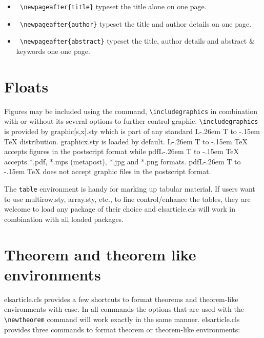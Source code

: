 \documentclass[a4paper,12pt]{article}
\makeatletter
\def\file#1{\textsf{#1}\xspace}
\DeclareRobustCommand{\LaTeX}{L\kern-.26em%
        {\sbox\z@ T%
         \vbox to\ht\z@{\hbox{\check@mathfonts
           \fontsize\sf@size\z@
           \math@fontsfalse\selectfont
          A\,}%
         \vss}%
        }%
     \kern-.15em%
    \TeX}
\makeatother
\begin{document}
\begin{vquote}
\end{vquote}


\begin{itemize}
\leftskip-2pc
\item [] {\tt\color{verbcolor} \verb+\newpageafter{title}+} typeset the title alone on one page.

\item [] {\tt\color{verbcolor} \verb+\newpageafter{author}+}  typeset the title
and author details on one page.

\item [] {\tt\color{verbcolor} \verb+\newpageafter{abstract}+}
typeset the title,
author details and abstract \& keywords one one page.

\end{itemize}

\section{Floats}
{Figures} may be included using the command, \verb+\includegraphics+ in
combination with or without its several options to further control
graphic. \verb+\includegraphics+ is provided by \file{graphic[s,x].sty}
which is part of any standard \LaTeX{} distribution.
\file{graphicx.sty} is loaded by default. \LaTeX{} accepts figures in
the postscript format while pdf\LaTeX{} accepts \file{*.pdf},
\file{*.mps} (metapost), \file{*.jpg} and \file{*.png} formats. 
pdf\LaTeX{} does not accept graphic files in the postscript format. 

The \verb+table+ environment is handy for marking up tabular
material. If users want to use \file{multirow.sty},
\file{array.sty}, etc., to fine control/enhance the tables, they
are welcome to load any package of their choice and
\file{elsarticle.cls} will work in combination with all loaded
packages.

\section[Theorem and ...]{Theorem and theorem like environments}

\file{elsarticle.cls} provides a few shortcuts to format theorems and
theorem-like environments with ease. In all commands the options that
are used with the \verb+\newtheorem+ command will work exactly in the same
manner. \file{elsarticle.cls} provides three commands to format theorem or
theorem-like environments: 
\end{document}
